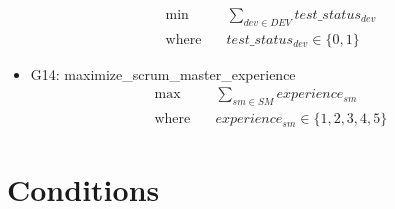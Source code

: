 \documentclass{article}
\begin{document}
\begin{itemize}
        \begin{align*}
            \min \quad & \sum_{dev \in DEV} test\_status_{dev} \\
            \text{where} \quad & test\_status_{dev} \in \{0, 1\}
        \end{align*}
    \item G14: maximize\_scrum\_master\_experience
        \begin{align*}
            \max \quad & \sum_{sm \in SM} experience_{sm} \\
            \text{where} \quad & experience_{sm} \in \{1, 2, 3, 4, 5\}
        \end{align*}
\end{itemize}

\section{Conditions}
\end{document}
